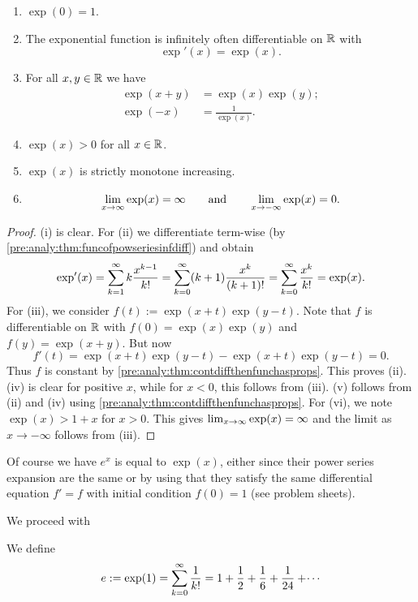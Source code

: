 \documentclass[10pt, a4paper]{article}
\newcommand{\infsumo}{\infsum[k = 0]}
\begin{document}
\begin{theorem}
    \begin{enumerate}[label = (\roman*)]
        \item $\exp(0) = 1$.
        \item The exponential function is infinitely often differentiable on $\R$ with
        \[
        \exp'(x) = \exp(x).
        \]
        \item For all $x, y \in \R$ we have
        \begin{align*}
            \exp(x + y) &= \exp(x)\exp(y); \\
            \exp(-x) &= \frac{1}{\exp(x)}.
        \end{align*}
        \item $\exp(x) > 0$ for all $x \in \R$.
        \item $\exp(x)$ is strictly monotone increasing.
        \item
        \[
        \liminfty[x]\exp(x) = \infty\qquad\text{and}\qquad\lim_{x \rightarrow -\infty}\exp(x) = 0.
        \]
    \end{enumerate}
    \begin{proof}
        (i) is clear.
        For (ii) we differentiate term-wise
        (by \autoref{pre:analy:thm:funcofpowseriesinfdiff})
        and obtain
        \[
        \exp'(x) = \infsum k\frac{x ^ {k - 1}}{k!} = \infsumo(k + 1)\frac{x ^ k}{(k + 1)!} = \infsumo\frac{x ^ k}{k!} = \exp(x).
        \]
        For (iii),
        we consider $f(t) := \exp(x + t)\exp(y - t)$.
        Note that $f$ is differentiable on $\R$ with $f(0) = \exp(x)\exp(y)$ and $f(y) = \exp(x + y)$.
        But now
        \[
        f'(t) = \exp(x + t)\exp(y - t) - \exp(x + t)\exp(y - t) = 0.
        \]
        Thus $f$ is constant by \autoref{pre:analy:thm:contdiffthenfunchasprops}.
        This proves (ii).
        (iv) is clear for positive $x$,
        while for $x < 0$,
        this follows from (iii).
        (v) follows from (ii) and (iv) using \autoref{pre:analy:thm:contdiffthenfunchasprops}.
        For (vi),
        we note $\exp(x) > 1 + x$ for $x > 0$.
        This gives $\liminfty[x]\exp(x) = \infty$ and the limit as $x \rightarrow -\infty$ follows from (iii).
    \end{proof}
\end{theorem}

\begin{remark}
    Of course we have $e ^ x$ is equal to $\exp(x)$,
    either since their power series expansion are the same or by using that they satisfy the same differential equation $f' = f$ with initial condition $f(0) = 1$
    (see problem sheets).
\end{remark}
We proceed with
\begin{definition}
    We define
    \[
    e := \exp(1) = \infsumo\frac{1}{k!} = 1 + \frac{1}{2} + \frac{1}{6} + \frac{1}{24} + \dotsi
    \]
\end{definition}
\end{document}
